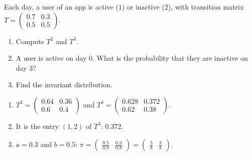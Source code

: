 \begin{exercise}
Each day, a user of an app is active ($1$) or inactive ($2$), with transition matrix $T=\begin{pmatrix}\num{0,7}&\num{0,3}\\\num{0,5}&\num{0,5}\end{pmatrix}$.
\begin{enumerate}
\item Compute $T^2$ and $T^3$.
\item A user is active on day $0$. What is the probability that they are inactive on day $3$?
\item Find the invariant distribution.
\end{enumerate}
\end{exercise}
\begin{solution}
\begin{enumerate}
\item $T^2=\begin{pmatrix}\num{0,64}&\num{0,36}\\\num{0,6}&\num{0,4}\end{pmatrix}$ and $T^3=\begin{pmatrix}\num{0,628}&\num{0,372}\\\num{0,62}&\num{0,38}\end{pmatrix}$.
\item It is the entry $(1,2)$ of $T^3$: $\num{0,372}$.
\item $a=\num{0,3}$ and $b=\num{0,5}$: $\pi=\begin{pmatrix}\frac{\num{0,5}}{\num{0,8}}&\frac{\num{0,3}}{\num{0,8}}\end{pmatrix}=\begin{pmatrix}\frac58&\frac38\end{pmatrix}$.
\end{enumerate}
\end{solution}

